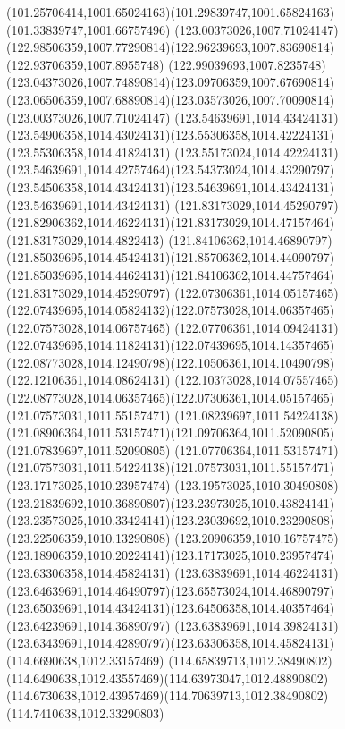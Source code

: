 {    \curveto(101.25706414,1001.65024163)(101.29839747,1001.65824163)(101.33839747,1001.66757496)
    \moveto(123.00373026,1007.71024147)
    \curveto(122.98506359,1007.77290814)(122.96239693,1007.83690814)(122.93706359,1007.8955748)
    \curveto(122.99039693,1007.8235748)(123.04373026,1007.74890814)(123.09706359,1007.67690814)
    \curveto(123.06506359,1007.68890814)(123.03573026,1007.70090814)(123.00373026,1007.71024147)
    \moveto(123.54639691,1014.43424131)
    \curveto(123.54906358,1014.43024131)(123.55306358,1014.42224131)(123.55306358,1014.41824131)
    \curveto(123.55173024,1014.42224131)(123.54639691,1014.42757464)(123.54373024,1014.43290797)
    \curveto(123.54506358,1014.43424131)(123.54639691,1014.43424131)(123.54639691,1014.43424131)
    \moveto(121.83173029,1014.45290797)
    \curveto(121.82906362,1014.46224131)(121.83173029,1014.47157464)(121.83173029,1014.4822413)
    \curveto(121.84106362,1014.46890797)(121.85039695,1014.45424131)(121.85706362,1014.44090797)
    \curveto(121.85039695,1014.44624131)(121.84106362,1014.44757464)(121.83173029,1014.45290797)
    \moveto(122.07306361,1014.05157465)
    \curveto(122.07439695,1014.05824132)(122.07573028,1014.06357465)(122.07573028,1014.06757465)
    \curveto(122.07706361,1014.09424131)(122.07439695,1014.11824131)(122.07439695,1014.14357465)
    \curveto(122.08773028,1014.12490798)(122.10506361,1014.10490798)(122.12106361,1014.08624131)
    \curveto(122.10373028,1014.07557465)(122.08773028,1014.06357465)(122.07306361,1014.05157465)
    \moveto(121.07573031,1011.55157471)
    \curveto(121.08239697,1011.54224138)(121.08906364,1011.53157471)(121.09706364,1011.52090805)
    \lineto(121.07839697,1011.52090805)
    \curveto(121.07706364,1011.53157471)(121.07573031,1011.54224138)(121.07573031,1011.55157471)
    \moveto(123.17173025,1010.23957474)
    \curveto(123.19573025,1010.30490808)(123.21839692,1010.36890807)(123.23973025,1010.43824141)
    \curveto(123.23573025,1010.33424141)(123.23039692,1010.23290808)(123.22506359,1010.13290808)
    \curveto(123.20906359,1010.16757475)(123.18906359,1010.20224141)(123.17173025,1010.23957474)
    \moveto(123.63306358,1014.45824131)
    \curveto(123.63839691,1014.46224131)(123.64639691,1014.46490797)(123.65573024,1014.46890797)
    \curveto(123.65039691,1014.43424131)(123.64506358,1014.40357464)(123.64239691,1014.36890797)
    \curveto(123.63839691,1014.39824131)(123.63439691,1014.42890797)(123.63306358,1014.45824131)
    \moveto(114.6690638,1012.33157469)
    \curveto(114.65839713,1012.38490802)(114.6490638,1012.43557469)(114.63973047,1012.48890802)
    \curveto(114.6730638,1012.43957469)(114.70639713,1012.38490802)(114.7410638,1012.33290803)
}
